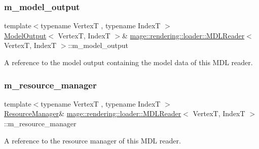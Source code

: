 \subsubsection{\texorpdfstring{m\+\_\+model\+\_\+output}{m\_model\_output}}
{\footnotesize\ttfamily template$<$typename VertexT , typename IndexT $>$ \\
\mbox{\hyperlink{structmage_1_1rendering_1_1_model_output}{Model\+Output}}$<$ VertexT, IndexT $>$\& \mbox{\hyperlink{classmage_1_1rendering_1_1loader_1_1_m_d_l_reader}{mage\+::rendering\+::loader\+::\+M\+D\+L\+Reader}}$<$ VertexT, IndexT $>$\+::m\+\_\+model\+\_\+output\hspace{0.3cm}{\ttfamily [private]}}

A reference to the model output containing the model data of this M\+DL reader. \mbox{\label{classmage_1_1rendering_1_1loader_1_1_m_d_l_reader_ae1a276e89104344daa25666e4b074643}} 
\subsubsection{\texorpdfstring{m\+\_\+resource\+\_\+manager}{m\_resource\_manager}}
{\footnotesize\ttfamily template$<$typename VertexT , typename IndexT $>$ \\
\mbox{\hyperlink{classmage_1_1rendering_1_1_resource_manager}{Resource\+Manager}}\& \mbox{\hyperlink{classmage_1_1rendering_1_1loader_1_1_m_d_l_reader}{mage\+::rendering\+::loader\+::\+M\+D\+L\+Reader}}$<$ VertexT, IndexT $>$\+::m\+\_\+resource\+\_\+manager\hspace{0.3cm}{\ttfamily [private]}}

A reference to the resource manager of this M\+DL reader. 